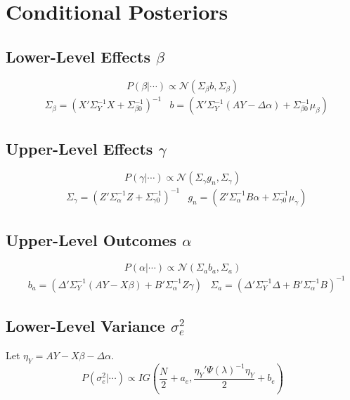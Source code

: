 \documentclass[11pt]{article}
\begin{document}
\section{Conditional Posteriors}
\subsection{Lower-Level Effects $\beta$}
\begin{equation}
P(\beta|\cdots) \propto \mathcal{N}(\Sigma_\beta b, \Sigma_\beta)
\end{equation}
\begin{align}
  &\Sigma_\beta = \left( X'\Sigma^{-1}_YX + \Sigma^{-1}_{\beta0} \right)^{-1}
&b = \left( X'\Sigma^{-1}_Y(AY - \Delta\alpha) + \Sigma^{-1}_{\beta0}\mu_\beta\right)
\end{align}

\subsection{Upper-Level Effects $\gamma$}
\begin{equation}
  P(\gamma|\cdots) \propto \mathcal{N}(\Sigma_\gamma g_n, \Sigma_\gamma )
\end{equation}
\begin{align}
&\Sigma_\gamma = \left(Z'\Sigma^{-1}_\alpha Z + \Sigma^{-1}_{\gamma0} \right)^{-1}
&g_n = \left(Z'\Sigma^{-1}_\alpha B\alpha + \Sigma^{-1}_{\gamma0}\mu_\gamma \right)
\end{align}

\subsection{Upper-Level Outcomes $\alpha$}
\begin{equation}
P(\alpha|\cdots) \propto \mathcal{N}(\Sigma_a b_a, \Sigma_a)
\end{equation}
\begin{align}
&b_a = \left(\Delta'\Sigma^{-1}_Y(AY - X\beta)
                + B'\Sigma^{-1}_\alpha Z\gamma \right)
&\Sigma_a = \left(\Delta'\Sigma^{-1}_Y\Delta
                  + B'\Sigma_\alpha^{-1}B\right)^{-1}
\end{align}

\subsection{Lower-Level Variance $\sigma^2_e$}
Let $\eta_Y = AY - X\beta - \Delta\alpha$.
\begin{equation}
  P(\sigma^2_e|\cdots) \propto IG\left(\frac{N}{2} + a_{e}, \frac{\eta_Y'\Psi(\lambda)^{-1}\eta_Y}{2} + b_{e} \right)
\end{equation}
\end{document}
